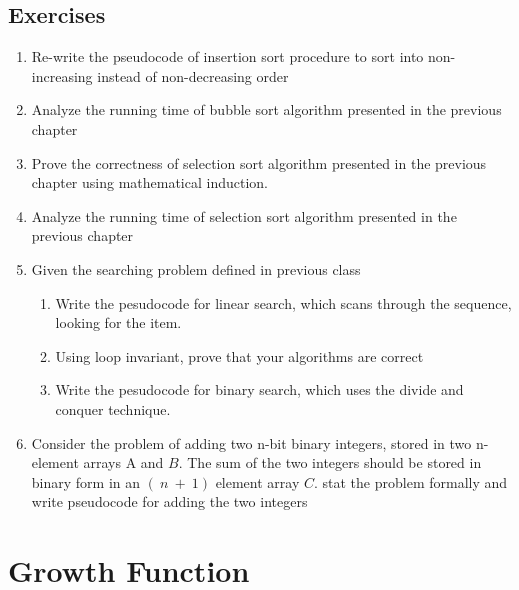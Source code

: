 \documentclass[12pt,a4paper]{book}
\begin{document}
\subsection{Exercises}
\begin{enumerate}
\item Re-write the pseudocode of insertion sort procedure to sort into non- increasing instead of non-decreasing order
\item Analyze the running time of bubble sort algorithm presented in the previous chapter
\item Prove the correctness of selection sort algorithm presented in the previous chapter using mathematical induction.
\item Analyze the running time of selection sort algorithm presented in the previous chapter
\item Given the searching problem defined in previous class
\begin{enumerate}
\item Write the pesudocode for linear search, which scans through the sequence, looking for the item.
\item Using loop invariant, prove that your algorithms are correct
\item Write the pesudocode for binary search, which uses the divide and conquer technique.
\end{enumerate}
\item Consider the problem of adding two n-bit binary integers, stored in two n-element arrays A and $B$. The sum of the two integers should be stored in binary form in an $(\ n\ +\ 1)$ element array $C$. stat the problem formally and write pseudocode for adding the two integers
\end{enumerate}
\section{Growth Function}
\end{document}

